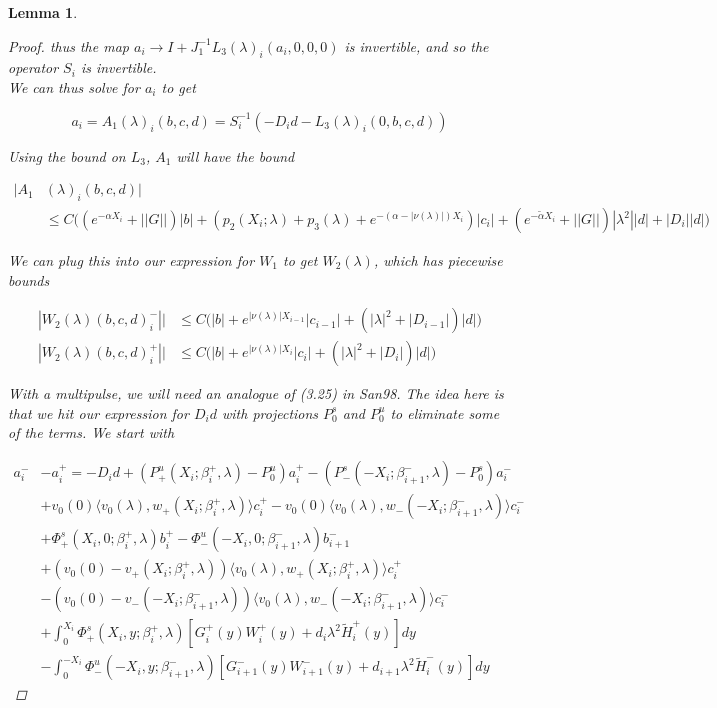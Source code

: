 \documentclass[12pt]{article}
\newtheorem{lemma}{Lemma}
\begin{document}
\begin{lemma}
\begin{proof}
thus the map $a_i \rightarrow I + J_1^{-1} L_3(\lambda)_i(a_i, 0, 0, 0)$ is invertible, and so the operator $S_i$ is invertible.\\

We can thus solve for $a_i$ to get

\[
a_i = A_1(\lambda)_i(b, c, d) = S_i^{-1}(-D_i d - L_3(\lambda)_i(0, b, c, d))
\]

Using the bound on $L_3$, $A_1$ will have the bound

\begin{align*}
|A_1&(\lambda)_i(b, c, d)| \\
&\leq C \Big( (e^{-\alpha X_i} + ||G||) |b| + ( p_2(X_i; \lambda) + p_3(\lambda) + e^{-(\alpha - |\nu(\lambda)|)X_i} )|c_i|
+ (e^{-\tilde{\alpha} X_i} + ||G||) |\lambda^2| |d| + |D_i||d| \Big)
\end{align*} 

We can plug this into our expression for $W_1$ to get $W_2(\lambda)$, which has piecewise bounds

\begin{align*}
|W_2(\lambda)(b,c,d)_i^-|| &\leq C \Big( |b| + e^{|\nu(\lambda)|X_{i-1}}|c_{i-1}| + (|\lambda|^2 + |D_{i-1}|)|d| \Big) \\
|W_2(\lambda)(b,c,d)_i^+|| 
&\leq C \Big( |b| + e^{|\nu(\lambda)|X_i}|c_i| + (|\lambda|^2 + |D_i|)|d| \Big)
\end{align*}

With a multipulse, we will need an analogue of (3.25) in San98. The idea here is that we hit our expression for $D_i d$ with projections $P^s_0$ and $P^u_0$ to eliminate some of the terms. We start with

\begin{align*}
a_i^- &- a_i^+ = -D_i d + (P^u_+(X_i; \beta_i^+, \lambda) - P_0^u)a_i^+ - (P^s_-(-X_i; \beta_{i+1}^-, \lambda) - P_0^s)a_i^- \\
&+ v_0(0) \langle v_0(\lambda), w_+(X_i; \beta_i^+, \lambda) \rangle c_i^+ 
- v_0(0) \langle v_0(\lambda), w_-(-X_i; \beta_{i+1}^-, \lambda) \rangle c_i^- \\
&+ \Phi^s_+(X_i, 0; \beta_i^+, \lambda)b_i^+ - \Phi^u_-(-X_i, 0; \beta_{i+1}^-, \lambda)b_{i+1}^- \\
&+ (v_0(0) - v_+(X_i; \beta_i^+, \lambda)) \langle v_0(\lambda), w_+(X_i; \beta_i^+, \lambda) \rangle c_i^+ \\
&- (v_0(0) - v_-(-X_i; \beta_{i+1}^-, \lambda)) \langle v_0(\lambda), w_-(-X_i; \beta_{i+1}^-, \lambda) \rangle c_i^- \\
&+ \int_0^{X_i} \Phi^s_+(X_i, y; \beta_i^+, \lambda) [ G_i^+(y) W_i^+(y) + d_i \lambda^2 \tilde{H}_i^+(y) ] dy \\
&- \int_0^{-X_i} \Phi^u_-(-X_i, y; \beta_{i+1}^-, \lambda) [ G_{i+1}^-(y) W_{i+1}^-(y) + d_{i+1} \lambda^2 \tilde{H}_i^-(y) ] dy 
\end{align*}


\end{proof}
\end{lemma}
\end{document}
